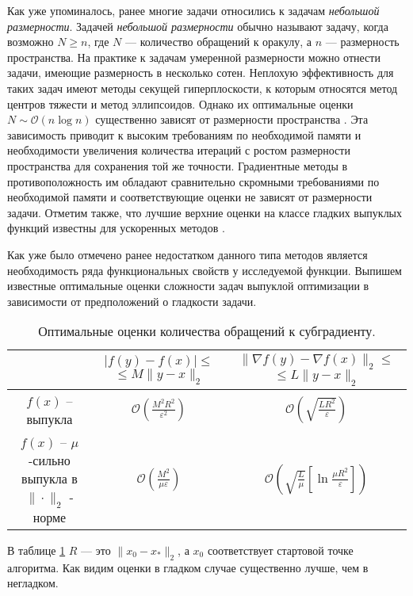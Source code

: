 Как уже упоминалось, ранее многие задачи относились к задачам \textit{небольшой размерности}. Задачей \textit{небольшой размерности} обычно называют задачу, когда возможно $N \geq n$, где $N$ --- количество обращений к оракулу, а $n$ --- размерность пространства. На практике к задачам умеренной размерности можно отнести задачи, имеющие размерность в несколько сотен. Неплохую эффективность для таких задач имеют методы секущей гиперплоскости, к которым относятся метод центров тяжести и метод эллипсоидов. Однако их оптимальные оценки $N \sim \mathcal{O}\left(n \log{n}\right)$ существенно зависят от размерности пространства \cite{bubeck_2015}. 
Эта зависимость приводит к высоким требованиям по необходимой памяти и необходимости увеличения количества итераций с ростом размерности пространства для сохранения той же точности. Градиентные методы в противоположность им обладают сравнительно скромными требованиями по необходимой памяти и соответствующие оценки не зависят от размерности задачи. Отметим также, что лучшие верхние оценки на классе гладких выпуклых функций известны для ускоренных методов \cite{Nesterov1983}.

Как уже было отмечено ранее недостатком данного типа методов является необходимость ряда функциональных свойств у исследуемой функции. Выпишем известные оптимальные оценки сложности задач выпуклой оптимизации в зависимости от предположений о гладкости задачи.

\begin{table}[h]
    \caption{Оптимальные оценки количества обращений к субградиенту.}
    \label{est_tbl}
    \centering
    \begin{tabular}{|c|c|c|}
        \hline
         & \makecell{$|f(y) - f(x)| \leq$ \\ $\leq M \| y - x \|_2$} & \makecell{$\|\nabla f(y) - \nabla f(x)\|_2 \leq $\\ $\leq L \| y - x \|_2$} \\
        \hline
        $f(x)$ -- выпукла & $\mathcal{O} \left( \frac{M^2 R^2}{\varepsilon^2} \right)$ & $\mathcal{O} \left( \sqrt{\frac{L R^2}{\varepsilon}} \right)$ \\
        \hline
        \makecell{$f(x)$ -- $\mu$-сильно \\ выпукла в $\| \cdot \|_2$ - норме} & $\mathcal{O} \left( \frac{M^2}{\mu \varepsilon} \right)$ & $\mathcal{O} \left( \sqrt{\frac{L}{\mu}} \left[\ln{\frac{\mu R^2}{\varepsilon}}\right] \right)$ \\
        \hline
    \end{tabular}
\end{table}
В таблице \ref{est_tbl} $R$ --- это $\|x_0 - x_*\|_2 $, а $x_0$ соответствует стартовой точке алгоритма. Как видим оценки в гладком случае существенно лучше, чем в негладком.


